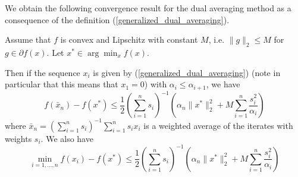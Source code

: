 We obtain the following convergence result for the dual averaging method as a consequence of the definition (\ref{generalized_dual_averaging}).
\begin{theorem}\label{dual_averaging_theorem}
 Assume that $f$ is convex and Lipschitz with constant $M$, i.e. $\|g\|_2\leq M$ for $g\in \partial f(x)$. Let 
 $x^*\in \arg\min_x f(x)$.
 
 Then if the sequence $x_i$ is given by (\ref{generalized_dual_averaging}) (note in particular that this means that
 $x_1 = 0$) with $\alpha_i \leq \alpha_{i+1}$, we have
 \begin{equation}
  f(\bar{x}_n) - f(x^*) \leq \frac{1}{2}\left(\displaystyle\sum_{i = 1}^n s_i\right)^{-1} \left(\alpha_n\|x^*\|_2^2 + M\displaystyle\sum_{i = 1}^n \frac{s_i^2}{\alpha_i}\right)
 \end{equation}
 where $\bar{x}_n = (\sum_{i = 1}^n s_i)^{-1}\sum_{i = 1}^n s_ix_i$ is a weighted average of the iterates with weights $s_i$.
 We also have
 \begin{equation}
  \min_{i = 1,...,n} f(x_i) - f(x^*) \leq \frac{1}{2}\left(\displaystyle\sum_{i = 1}^n s_i\right)^{-1} \left(\alpha_n\|x^*\|_2^2 + M\displaystyle\sum_{i = 1}^n \frac{s_i^2}{\alpha_i}\right)
 \end{equation}

\end{theorem}
